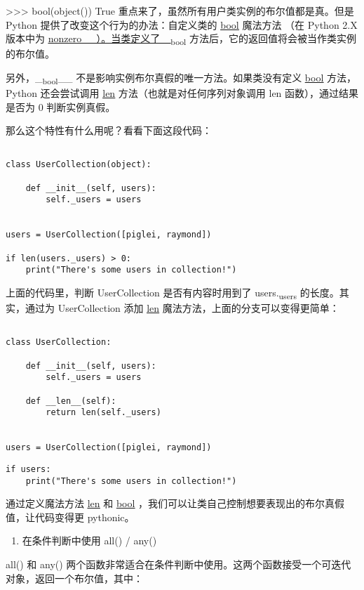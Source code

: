 \documentclass[11pt]{article}
\begin{document}
>>> bool(object())
True
重点来了，虽然所有用户类实例的布尔值都是真。但是 Python 提供了改变这个行为的办法：自定义类的 \uline{\uline{bool}} 魔法方法 （在 Python 2.X 版本中为 \uline{\uline{nonzero\_\_）。当类定义了 \_\textsubscript{bool}}} 方法后，它的返回值将会被当作类实例的布尔值。

另外，\_\textsubscript{bool}\_\_ 不是影响实例布尔真假的唯一方法。如果类没有定义 \uline{\uline{bool}} 方法，Python 还会尝试调用 \uline{\uline{len}} 方法（也就是对任何序列对象调用 len 函数），通过结果是否为 0 判断实例真假。

那么这个特性有什么用呢？看看下面这段代码：
\begin{verbatim}

class UserCollection(object):

    def __init__(self, users):
        self._users = users


users = UserCollection([piglei, raymond])

if len(users._users) > 0:
    print("There's some users in collection!")
\end{verbatim}
上面的代码里，判断 UserCollection 是否有内容时用到了 users.\textsubscript{users} 的长度。其实，通过为 UserCollection 添加 \uline{\uline{len}} 魔法方法，上面的分支可以变得更简单：
\begin{verbatim}

class UserCollection:

    def __init__(self, users):
        self._users = users

    def __len__(self):
        return len(self._users)


users = UserCollection([piglei, raymond])

\end{verbatim}

\begin{verbatim}
if users:
    print("There's some users in collection!")
\end{verbatim}
通过定义魔法方法 \uline{\uline{len}} 和 \uline{\uline{bool}} ，我们可以让类自己控制想要表现出的布尔真假值，让代码变得更 pythonic。

\begin{enumerate}
\item 在条件判断中使用 all() / any()
\end{enumerate}
all() 和 any() 两个函数非常适合在条件判断中使用。这两个函数接受一个可迭代对象，返回一个布尔值，其中：
\end{document}
